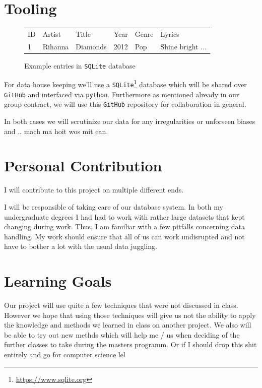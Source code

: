 \documentclass[11pt,a4paper]{article}
\begin{document}
\section{Tooling}
\begin{figure}[h!]
	\centering
	\scriptsize
	\begin{tabular}{llllll}
ID & Artist & Title & Year & Genre & Lyrics \\
1 & Rihanna & Diamonds & 2012 & Pop & Shine bright $\ldots$ \\
	\end{tabular}
	\caption{Example entries in \texttt{SQLite} database}
	\label{fig:table}
\end{figure}
For data house keeping we'll use a \texttt{SQLite}\footnote{\url{https://www.sqlite.org}} database which will be shared over \texttt{GitHub} and interfaced via \texttt{python}. Furthermore as mentioned already in our group contract, we will use this \texttt{GitHub} repository for collaboration in general. 

In both cases we will scrutinize %
our data for any irregularities or unforseen biases and .. mach ma hoit wos mit ean.


\section{Personal Contribution}

I will contribute to this project on multiple different ends. 

I will be responsible of taking care of our database system. In both my undergraduate degrees I had had to work with rather large datasets that kept changing during work. Thus, I am familiar with a few pitfalls concerning data handling. My work should ensure that all of us can work undisrupted and not have to bother a lot with the usual data juggling. 

\section{Learning Goals}

Our project will use quite a few techniques that were not discussed in class. However we hope that using those techniques will give us not the ability to apply the knowledge and methods we learned in class on another project. We also will be able to try out new methds which will help me / us when deciding of the further classes to take during the masters programm. Or if I should drop this shit entirely and go for computer science lel





\end{document}
